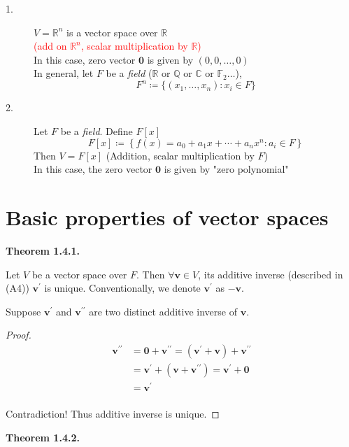 \documentclass[12pt]{article}
\begin{document}
\begin{description}
\item[1.] $V = \mathbb{R}^n$ is a vector space over $\mathbb{R}$\\ \textcolor{red}{(add on $\mathbb{R}^n$, scalar multiplication by $\mathbb{R}$)}\\ In this case, zero vector $\mathbf{0}$ is given by $(0, 0,\ldots, 0)$\\ In general, let $F$ be a \emph{field} ($\mathbb{R}$ or $\mathbb{Q}$ or $\mathbb{C}$ or $\mathbb{F}_2 \ldots$), 
\[
F^n
\coloneqq
\{(x_1,\ldots,x_n):x_i\in F\}
\]
\item[2.] Let $F$ be a \emph{field}. Define $F[x]$
\[
F[x]
\coloneqq
\left\{
f(x) 
=
a_0+a_1x+\cdots+a_nx^n
:
a_i\in F
\right\}
\]
Then $V = F[x]$ (Addition, scalar multiplication by $F$)\\ In this case, the zero vector $\mathbf{0}$ is given by "zero polynomial"

\end{description}

\section{Basic properties of vector spaces}

\textbf{Theorem 1.4.1.}

Let $V$ be a vector space over $F$. 
Then $\forall \mathbf{v} \in V$, its additive inverse (described in (A4)) $\mathbf{v^\prime}$ is unique. Conventionally, we denote $\mathbf{v^\prime}$ as $\mathbf{-v}$.

Suppose $\mathbf{v^\prime}$ and $\mathbf{v^{\prime\prime}}$ are two distinct additive inverse of $\mathbf{v}$.
\begin{proof}
\[
\begin{aligned}
\mathbf{v^{\prime\prime}} 
&= \mathbf{0} + \mathbf{v^{\prime\prime}} = (\mathbf{v^\prime} + \mathbf{v}) + \mathbf{v^{\prime\prime}}\\ 
&= \mathbf{v^\prime} + (\mathbf{v} + \mathbf{v^{\prime\prime}}) = \mathbf{v^\prime} + \mathbf{0}\\
&= \mathbf{v^\prime}\\
\end{aligned}
\]

Contradiction! Thus additive inverse is unique.
\end{proof}

\bigskip

\textbf{Theorem 1.4.2.}
\end{document}
